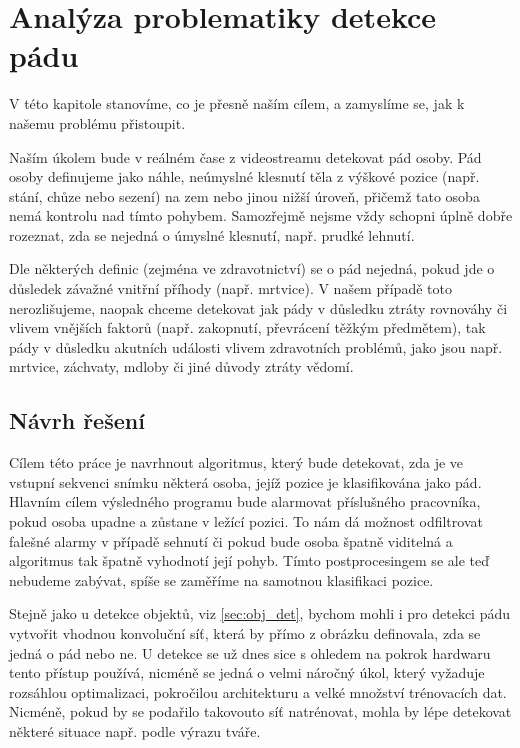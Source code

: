 \chapter{Analýza problematiky detekce pádu}
\label{chap:Goal}

V této kapitole stanovíme, co je přesně naším cílem, a zamyslíme se, jak k našemu
problému přistoupit.

Naším úkolem bude v reálném čase z videostreamu detekovat pád osoby. Pád osoby
definujeme jako náhle, neúmyslné klesnutí těla z výškové pozice (např. stání,
chůze nebo sezení) na zem nebo jinou nižší úroveň, přičemž tato osoba nemá
kontrolu nad tímto pohybem. Samozřejmě nejsme vždy schopni úplně dobře
rozeznat, zda se nejedná o úmyslné klesnutí, např. prudké lehnutí.

Dle některých definic (zejména ve zdravotnictví) se o pád nejedná, pokud jde o
důsledek závažné vnitřní příhody (např. mrtvice). V našem případě toto
nerozlišujeme, naopak chceme detekovat jak pády v důsledku ztráty rovnováhy či
vlivem vnějších faktorů (např. zakopnutí, převrácení těžkým předmětem), tak
pády v důsledku akutních události vlivem zdravotních problémů, jako jsou např.
mrtvice, záchvaty, mdloby či jiné důvody ztráty vědomí.

\section{Návrh řešení}

Cílem této práce je navrhnout algoritmus, který bude detekovat, zda je ve
vstupní sekvenci snímku některá osoba, jejíž pozice je klasifikována jako pád.
Hlavním cílem výsledného programu bude alarmovat příslušného pracovníka, pokud
osoba upadne a zůstane v ležící pozici. To nám dá možnost odfiltrovat falešné
alarmy v případě sehnutí či pokud bude osoba špatně viditelná a algoritmus tak
špatně vyhodnotí její pohyb. Tímto postprocesingem se ale teď nebudeme zabývat,
spíše se zaměříme na samotnou klasifikaci pozice.

Stejně jako u detekce objektů, viz \ref{sec:obj_det}, bychom mohli i pro
detekci pádu vytvořit vhodnou konvoluční síť, která by přímo z obrázku
definovala, zda se jedná o pád nebo ne. U detekce se už dnes sice s ohledem na
pokrok hardwaru tento přístup používá, nicméně se jedná o velmi náročný úkol,
který vyžaduje rozsáhlou optimalizaci, pokročilou architekturu a velké množství
trénovacích dat. Nicméně, pokud by se podařilo takovouto síť natrénovat, mohla
by lépe detekovat některé situace např. podle výrazu tváře.

